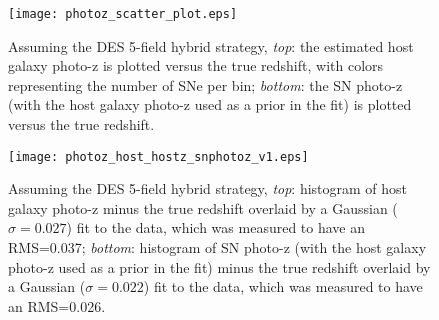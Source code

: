 \documentclass[preprint2]{aastex}    %
\begin{document}
\begin{figure}[ht]
\centerline{\texttt{[image: photoz\_scatter\_plot.eps]}}
\caption{Assuming the DES 5-field hybrid strategy, \textit{top}: 
the estimated host galaxy photo-z is plotted versus the 
true redshift, with colors representing the number of SNe per 
bin; \textit{bottom}: the SN photo-z (with the host galaxy photo-z used as 
a prior in the fit) is plotted versus the true redshift.
}
\label{fig:photoz_scatterplot}
\end{figure}

\begin{figure}[ht]
\centerline{\texttt{[image: photoz\_host\_hostz\_snphotoz\_v1.eps]}}
\caption{Assuming the DES 5-field hybrid strategy, \textit{top}: histogram of host galaxy 
photo-z minus the true redshift overlaid by a Gaussian ($\sigma = 0.027$) fit to the data, 
which was measured to have an RMS=0.037;
\textit{bottom}: histogram of SN photo-z (with the host galaxy 
photo-z used as a prior in the fit) minus the true redshift 
overlaid by a Gaussian ($\sigma = 0.022$) fit to the data, 
which was measured to have an RMS=0.026.
}
\label{fig:photoz_hists}
\end{figure}
\end{document}
